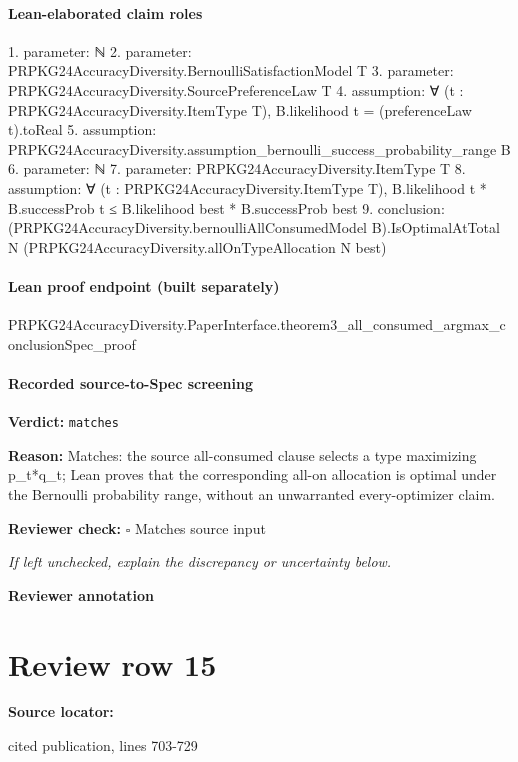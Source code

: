 \documentclass[10pt]{article}
\newcommand{\reviewerbox}{%
  \par\noindent\fbox{\parbox{0.96\linewidth}{\rule{0pt}{0.38in}}}\par
}
\newcommand{\reviewmatch}[1]{%
  \par\noindent\textbf{Reviewer check:} $\square$\; #1\par
  \noindent\emph{If left unchecked, explain the discrepancy or uncertainty below.}\par
}
\begin{document}
\paragraph{Lean-elaborated claim roles}\begin{ReviewVerbatim}
1. parameter: ℕ
2. parameter: PRPKG24AccuracyDiversity.BernoulliSatisfactionModel T
3. parameter: PRPKG24AccuracyDiversity.SourcePreferenceLaw T
4. assumption: ∀ (t : PRPKG24AccuracyDiversity.ItemType T), B.likelihood t = (preferenceLaw t).toReal
5. assumption: PRPKG24AccuracyDiversity.assumption_bernoulli_success_probability_range B
6. parameter: ℕ
7. parameter: PRPKG24AccuracyDiversity.ItemType T
8. assumption: ∀ (t : PRPKG24AccuracyDiversity.ItemType T), B.likelihood t * B.successProb t ≤ B.likelihood best * B.successProb best
9. conclusion: (PRPKG24AccuracyDiversity.bernoulliAllConsumedModel B).IsOptimalAtTotal N
  (PRPKG24AccuracyDiversity.allOnTypeAllocation N best)
\end{ReviewVerbatim}

\paragraph{Lean proof endpoint (built separately)}\begin{ReviewVerbatim}
PRPKG24AccuracyDiversity.PaperInterface.theorem3_all_consumed_argmax_conclusionSpec_proof
\end{ReviewVerbatim}

\paragraph{Recorded source-to-Spec screening}
\textbf{Verdict:} \texttt{matches}
\\
{\raggedright
\textbf{Reason:} Matches:\allowbreak{} the source all-\allowbreak{}consumed clause selects a type maximizing p\_\allowbreak{}t*q\_\allowbreak{}t;\allowbreak{} Lean proves that the corresponding all-\allowbreak{}on allocation is optimal under the Bernoulli probability range, without an unwarranted every-\allowbreak{}optimizer claim.\allowbreak{}
\par}
\reviewmatch{Matches source input}
\noindent\textbf{Reviewer annotation}\par
\reviewerbox
\clearpage
\hypertarget{source-claim-e8b459af037ff529}{}
\section*{Review row 15}
\textbf{Source locator:} {\footnotesize\raggedright cited publication, lines 703-\allowbreak{}729\par}
\end{document}
